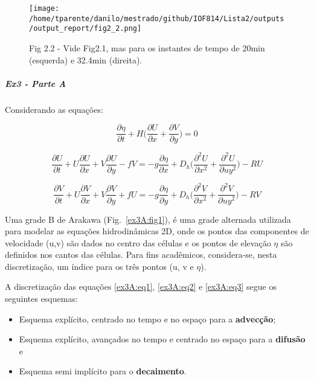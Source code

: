 \documentclass[11pt]{article}
\makeatletter
\def\maxwidth{\ifdim\Gin@nat@width>\linewidth\linewidth
    \else\Gin@nat@width\fi}
\let\Oldincludegraphics\includegraphics
\renewcommand{\includegraphics}[1]{\Oldincludegraphics[width=.8\maxwidth]{#1}}
\providecommand{\tightlist}{%
      \setlength{\itemsep}{0pt}\setlength{\parskip}{0pt}}
\makeatother
\begin{document}
\begin{figure}[!ht]
\centering
\texttt{[image: /home/tparente/danilo/mestrado/github/IOF814/Lista2/outputs/output\_report/fig2\_2.png]}
\caption{Fig 2.2 - Vide Fig2.1, mas para os instantes de tempo de 20min (esquerda) e 32.4min (direita).}
\label{fig2:2}
\end{figure}


\dotfill

    \subparagraph{Ex3 - Parte A}\label{ex3---parte-a}

Considerando as equações:

\begin{equation}
    \frac{\partial{\eta}}{\partial{t}} + H \bigg( \frac{\partial{U}}{\partial{x}} + \frac{\partial{V}}{\partial{y}} \bigg) = 0
    \label{ex3A:eq1}
\end{equation}

\begin{equation}
    \frac{\partial{U}}{\partial{t}} + U\frac{\partial{U}}{\partial{x}} + V\frac{\partial{U}}{\partial{y}} - fV = -g\frac{\partial{\eta}}{\partial{x}} + D_h \bigg( \frac{\partial^2{U}}{\partial{x^2}} + \frac{\partial^2{U}}{\partial{uy^2}} \bigg) - RU
    \label{ex3A:eq2}
\end{equation}

\begin{equation}
    \frac{\partial{V}}{\partial{t}} + U\frac{\partial{V}}{\partial{x}} + V\frac{\partial{V}}{\partial{y}} + fU = -g\frac{\partial{\eta}}{\partial{y}} + D_h \bigg( \frac{\partial^2{V}}{\partial{x^2}} + \frac{\partial^2{V}}{\partial{uy^2}} \bigg) - RV
    \label{ex3A:eq3}
\end{equation}

Uma grade B de Arakawa (Fig.~\ref{ex3A:fig1}), é uma
grade alternada utilizada para modelar as equações hidrodinâmicas 2D,
onde os pontos das componentes de velocidade (u,v) são dados no centro
das células e os pontos de elevação \(\eta\) são definidos nos cantos
das células. Para fins acadêmicos, considera-se, nesta discretização,
um índice para os três pontos (u, v e \(\eta\)).

A discretização das equações \ref{ex3A:eq1}, \ref{ex3A:eq2} e
\ref{ex3A:eq3} segue os seguintes esquemas:

\begin{itemize}
\tightlist
\item
  Esquema explícito, centrado no tempo e no espaço para a
  \textbf{advecção};
\item
  Esquema explícito, avançados no tempo e centrado no espaço para a
  \textbf{difusão} e
\item
  Esquema semi implícito para o \textbf{decaimento}.
\end{itemize}
\end{document}
